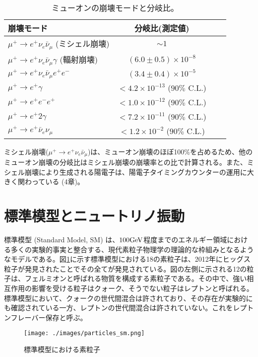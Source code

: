 \documentclass[Yonemoto_master.tex]{subfiles}
\begin{document}
\begin{table}[h]
 \centering
 \caption{ミューオンの崩壊モードと分岐比\cite{muon}。}
 \label{tab: Mu_mode}
  \begin{tabular}{lccc}
   \hline
   崩壊モード & 分岐比(測定値)\\
   \hline \hline
   $\mu^+ \to e^+\nu_e\bar{\nu}_{\mu}$ (ミシェル崩壊)& $\sim 1$ \\
   $\mu^+ \to e^+\nu_e\bar{\nu}_{\mu}\gamma$ (輻射崩壊)& $(6.0 \pm 0.5) \times 10^{-8} $ \\
   $\mu^+ \to e^+\nu_e\bar{\nu}_{\mu}e^+e^- $ & $(3.4 \pm 0.4) \times 10^{-5} $ \\
   \hline
   $\mu^+ \to e^+\gamma$ & $< 4.2 \times 10^{-13}$ ($90 \%$ C.L.)\\
   $\mu^+ \to e^+e^-e^+$ & $< 1.0 \times 10^{-12} $ ($90 \%$ C.L.)\\
   $\mu^+ \to e^+2\gamma$ & $< 7.2 \times 10^{-11}$ ($90 \%$ C.L.)\\
   $\mu^+ \to e^+\bar{\nu}_e\nu_{\mu}$ & $< 1.2 \times 10^{-2} $ ($90 \%$ C.L.)\\
   \hline
  \end{tabular}
\end{table}

ミシェル崩壊($\mu^+ \to e^+\nu_e\bar{\nu}_{\mu}$)は、ミューオン崩壊のほぼ100\%を占めるため、他のミューオン崩壊の分岐比はミシェル崩壊の崩壊率との比で計算される。また、ミシェル崩壊により生成される陽電子は、陽電子タイミングカウンターの運用に大きく関わっている (4章)。

\section{標準模型とニュートリノ振動}
標準模型 (Standard Model, SM) は、$100 \rm{GeV}$程度までのエネルギー領域における多くの実験的事実と整合する、現代素粒子物理学の理論的な枠組みとなるようなモデルである。図\ref{fig: sm_par}に示す標準模型における18の素粒子は、2012年にヒッグス粒子が発見されたことでその全てが発見されている。図の左側に示される12の粒子は、フェルミオンと呼ばれる物質を構成する素粒子である。その中で、強い相互作用の影響を受ける粒子はクォーク、そうでない粒子はレプトンと呼ばれる。標準模型において、クォークの世代間混合は許されており、その存在が実験的にも確認されている一方、レプトンの世代間混合は許されていない。これをレプトンフレーバー保存と呼ぶ。

\begin{figure}[h]
\begin{center}
\texttt{[image: ./images/particles\_sm.png]}
\caption{標準模型における素粒子 \cite{particles_sm}}
\label{fig: sm_par}
\end{center}
\end{figure}
\end{document}
